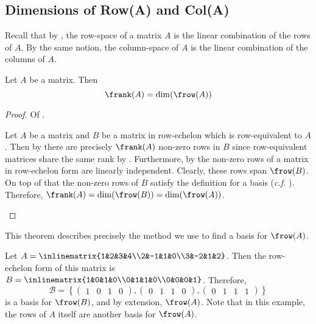 \subsection{Dimensions of Row(A) and Col(A)}\label{subsec-dim-row-col}

\begin{rem}
	Recall that by , the row-space of a
	matrix $A$ is the linear combination of the rows of $A$. By the same notion,
	the column-space of $A$ is the linear combination of the columns of $A$.
\end{rem}

\begin{thm}\label{thm-dim-row-rank}
	Let $A$ be a matrix. Then
	\begin{equation}
		\frank(A)=\dim(\frow(A))
	\end{equation}
\end{thm}

\begin{proof}
	Of .
	\begin{flushleft}
		Let $A$ be a matrix and $B$ be a matrix in row-echelon which is row-equivalent
		to $A$. Then by  there are precisely $\frank(A)$
		non-zero rows in $B$ since row-equivalent matrices share the same rank by
		. Furthermore, by
		 the
		non-zero rows of a matrix in row-echelon form are linearly independent.
		Clearly, these rows span $\frow(B)$. On top of that the non-zero rows of
		$B$ satisfy the definition for a basis (\textit{c.f.} ).
		Therefore, $\frank(A)=\dim(\frow(B))=\dim(\frow(A))$.
	\end{flushleft}
\end{proof}

\begin{rem}
	This theorem describes precisely the method we use to find a basis for $\frow(A)$.
\end{rem}

\begin{exm}
	Let $A=\inlinematrix{1&2&3&4\\2&-1&1&0\\3&-2&1&2}$. Then the row-echelon form
	of this matrix is
	$B=\inlinematrix{1&0&1&0\\0&1&1&0\\0&0&0&1}$. Therefore,
	\begin{equation*}
		\mathcal{B}=\left\{\begin{pmatrix}
			1 & 0 & 1 & 0
		\end{pmatrix},
		\begin{pmatrix}
			0 & 1 & 1 & 0
		\end{pmatrix},
		\begin{pmatrix}
			0 & 1 & 1 & 1
		\end{pmatrix}\right\}
	\end{equation*}
	is a basis for $\frow(B)$, and by extension, $\frow(A)$. Note that in this
	example, the rows of $A$ itself are another basis for $\frow(A)$.
\end{exm}

